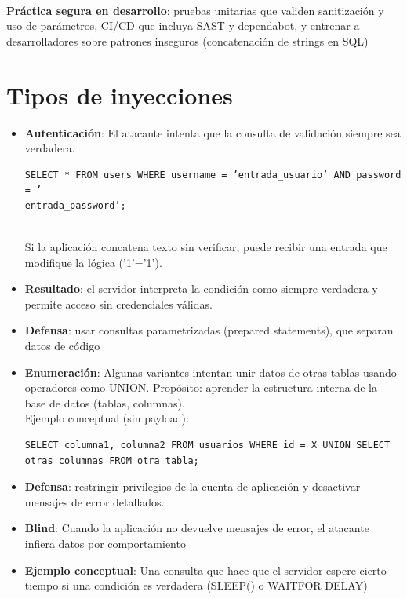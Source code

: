 \documentclass[a4paper,12pt]{article}
\begin{document}
\\ \textbf{Práctica segura en desarrollo}: pruebas unitarias que validen sanitización y uso de parámetros, CI/CD que incluya SAST y dependabot, y entrenar a desarrolladores sobre patrones inseguros (concatenación de strings en SQL)

\section*{Tipos de inyecciones}

\begin{itemize}
    \item \textbf{Autenticación}: El atacante intenta que la consulta de validación siempre sea verdadera.
    \begin{lstlisting}
SELECT * FROM users WHERE username = ’entrada_usuario’ AND password = ’
entrada_password’;
    \end{lstlisting}
    \\Si la aplicación concatena texto sin verificar, puede recibir una entrada que modifique la lógica (’1’=’1’).
    
    \item \textbf{Resultado}: el servidor interpreta la condición como siempre verdadera y permite acceso sin credenciales válidas.

    \item \textbf{Defensa}: usar consultas parametrizadas (prepared statements), que separan datos de código

    \item \textbf{Enumeración}: Algunas variantes intentan unir datos de otras tablas usando operadores como UNION. Propósito: aprender la estructura interna de la base de datos (tablas, columnas).
    \\Ejemplo conceptual (sin payload):
    \begin{lstlisting}
SELECT columna1, columna2 FROM usuarios WHERE id = X UNION SELECT otras_columnas FROM otra_tabla;
    \end{lstlisting}

    \item \textbf{Defensa}: restringir privilegios de la cuenta de aplicación y desactivar mensajes de error detallados.


    \item \textbf{Blind}: Cuando la aplicación no devuelve mensajes de error, el atacante infiera datos por comportamiento
    
    \item \textbf{Ejemplo conceptual}: Una consulta que hace que el servidor espere cierto tiempo si una condición es verdadera (SLEEP() o WAITFOR DELAY)
\end{itemize}
\end{document}
